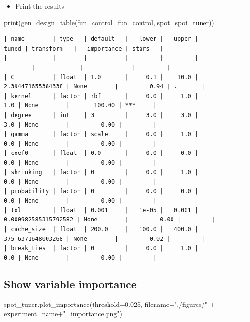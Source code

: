 \documentclass[
  letterpaper,
  DIV=11,
  numbers=noendperiod]{scrreprt}
\newenvironment{Shaded}{\begin{snugshade}}{\end{snugshade}}
\newcommand{\BuiltInTok}[1]{\textcolor[rgb]{0.00,0.23,0.31}{#1}}
\newcommand{\FloatTok}[1]{\textcolor[rgb]{0.68,0.00,0.00}{#1}}
\newcommand{\NormalTok}[1]{\textcolor[rgb]{0.00,0.23,0.31}{#1}}
\newcommand{\OperatorTok}[1]{\textcolor[rgb]{0.37,0.37,0.37}{#1}}
\newcommand{\StringTok}[1]{\textcolor[rgb]{0.13,0.47,0.30}{#1}}
\providecommand{\tightlist}{%
  \setlength{\itemsep}{0pt}\setlength{\parskip}{0pt}}\usepackage{longtable,booktabs,array}
\begin{document}
\begin{itemize}
\tightlist
\item
  Print the results
\end{itemize}

\begin{Shaded}
\begin{Highlighting}[]
\BuiltInTok{print}\NormalTok{(gen\_design\_table(fun\_control}\OperatorTok{=}\NormalTok{fun\_control,}
\NormalTok{    spot}\OperatorTok{=}\NormalTok{spot\_tuner))}
\end{Highlighting}
\end{Shaded}

\begin{verbatim}
| name        | type   | default   |   lower |   upper |                tuned | transform   |   importance | stars   |
|-------------|--------|-----------|---------|---------|----------------------|-------------|--------------|---------|
| C           | float  | 1.0       |     0.1 |    10.0 |    2.394471655384338 | None        |         0.94 | .       |
| kernel      | factor | rbf       |     0.0 |     1.0 |                  1.0 | None        |       100.00 | ***     |
| degree      | int    | 3         |     3.0 |     3.0 |                  3.0 | None        |         0.00 |         |
| gamma       | factor | scale     |     0.0 |     1.0 |                  0.0 | None        |         0.00 |         |
| coef0       | float  | 0.0       |     0.0 |     0.0 |                  0.0 | None        |         0.00 |         |
| shrinking   | factor | 0         |     0.0 |     1.0 |                  0.0 | None        |         0.00 |         |
| probability | factor | 0         |     0.0 |     0.0 |                  0.0 | None        |         0.00 |         |
| tol         | float  | 0.001     |   1e-05 |   0.001 | 0.000982585315792582 | None        |         0.00 |         |
| cache_size  | float  | 200.0     |   100.0 |   400.0 |    375.6371648003268 | None        |         0.02 |         |
| break_ties  | factor | 0         |     0.0 |     1.0 |                  0.0 | None        |         0.00 |         |
\end{verbatim}

\hypertarget{show-variable-importance}{%
\subsection{Show variable importance}\label{show-variable-importance}}

\begin{Shaded}
\begin{Highlighting}[]
\NormalTok{spot\_tuner.plot\_importance(threshold}\OperatorTok{=}\FloatTok{0.025}\NormalTok{, filename}\OperatorTok{=}\StringTok{"./figures/"} \OperatorTok{+}\NormalTok{ experiment\_name}\OperatorTok{+}\StringTok{"\_importance.png"}\NormalTok{)}
\end{Highlighting}
\end{Shaded}
\end{document}
